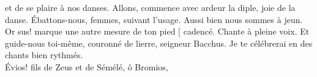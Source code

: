 \documentclass[12pt]{book}%
\newcommand{\passeLigne}[0]{\skipnumbering}%
\newcommand{\fin}[0]{\linebreak\passeLigne\protect\hfill $[$ }%
\newcommand{\ligne}[1]{\setline{#1}\hidenumbering}%
\newcommand{\espace}[1]{\hspace{#1}}%
\newcommand{\francais}[1]{{\policeFr #1}}%
\newcommand{\chantChoeurFr}[1]{%
\hangindent=50pt%
\espace{30pt}%
\francais{#1%
}}%
\newenvironment{groupe}{%
\pstart%
\ledgroup%
}{%
\pend %
}%
\begin{document}
\begin{pages}
\begin{Rightside}
\begin{groupe}%
\chantChoeurFr{et de se plaire}
\end{groupe}%
\begin{groupe}%
\chantChoeurFr{à nos danses.}
\end{groupe}%
\begin{groupe}%
\chantChoeurFr{Allons, commence avec ardeur}
\end{groupe}%
\begin{groupe}%
\chantChoeurFr{la diple, joie de la danse.}
\end{groupe}%
\begin{groupe}%
\chantChoeurFr{\ligne{983}Ébattons-nous, femmes, suivant l'usage.}
\end{groupe}%
\begin{groupe}%
\chantChoeurFr{Aussi bien nous sommes à jeun.\\\passeLigne}%
\end{groupe}%
\begin{groupe}%
\chantChoeurFr{Or sus! marque une autre mesure de ton pied \fin cadencé.}
\end{groupe}%
\begin{groupe}%
\chantChoeurFr{Chante à pleine voix.}
\end{groupe}%
\begin{groupe}%
\chantChoeurFr{Et guide-nous toi-même,}
\end{groupe}%
\begin{groupe}%
\chantChoeurFr{couronné de lierre, seigneur Bacchus.}
\end{groupe}%
\begin{groupe}%
\chantChoeurFr{\ligne{988}Je te célébrerai}
\end{groupe}%
\begin{groupe}%
\chantChoeurFr{en des chants bien rythmés.\\\passeLigne}%
\end{groupe}%
\begin{groupe}%
\chantChoeurFr{Évios! fils de Zeus}
\end{groupe}%
\begin{groupe}%
\chantChoeurFr{et de Sémélé, ô Bromios,}
\end{groupe}%

\end{Rightside}
\end{pages}
\end{document}

